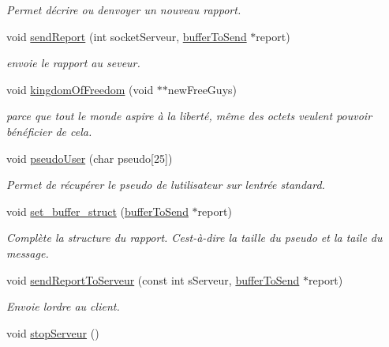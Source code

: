 \begin{DoxyCompactItemize}
\begin{DoxyCompactList}\small\item\em Permet d\textquotesingle{}écrire ou d\textquotesingle{}envoyer un nouveau rapport. \end{DoxyCompactList}\item 
void \hyperlink{group__client_ga579c9c1d62bd4fe80e72dfc424e88251}{send\+Report} (int socket\+Serveur, \hyperlink{structsbuffer_to_send}{buffer\+To\+Send} $\ast$report)
\begin{DoxyCompactList}\small\item\em envoie le rapport au seveur. \end{DoxyCompactList}\item 
void \hyperlink{group__client_gac0e6b092ca870499ed8aa48295046527}{kingdom\+Of\+Freedom} (void $\ast$$\ast$new\+Free\+Guys)
\begin{DoxyCompactList}\small\item\em parce que tout le monde aspire à la liberté, même des octets veulent pouvoir bénéficier de cela. \end{DoxyCompactList}\item 
void \hyperlink{group__client_gaddc404e3b046aad347a092251d8ad25c}{pseudo\+User} (char pseudo\mbox{[}25\mbox{]})
\begin{DoxyCompactList}\small\item\em Permet de récupérer le pseudo de l\textquotesingle{}utilisateur sur l\textquotesingle{}entrée standard. \end{DoxyCompactList}\item 
void \hyperlink{group__client_ga77b9bbe116a27d989907f5e1883ed4c0}{set\+\_\+buffer\+\_\+struct} (\hyperlink{structsbuffer_to_send}{buffer\+To\+Send} $\ast$report)
\begin{DoxyCompactList}\small\item\em Complète la structure du rapport. C\textquotesingle{}est-\/à-\/dire la taille du pseudo et la taile du message. \end{DoxyCompactList}\item 
void \hyperlink{group__client_ga6fccf851c95d9610cf70360d8c0e30c6}{send\+Report\+To\+Serveur} (const int s\+Serveur, \hyperlink{structsbuffer_to_send}{buffer\+To\+Send} $\ast$report)
\begin{DoxyCompactList}\small\item\em Envoie l\textquotesingle{}ordre au client. \end{DoxyCompactList}\item 
\hypertarget{group__client_ga7de73413f4b6a3568d7e7891aa595424}{}void \hyperlink{group__client_ga7de73413f4b6a3568d7e7891aa595424}{stop\+Serveur} ()\label{group__client_ga7de73413f4b6a3568d7e7891aa595424}


\end{DoxyCompactItemize}
